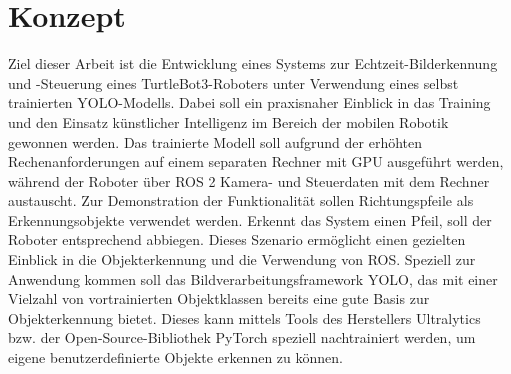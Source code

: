 \section{Konzept}\label{sec:konzept}
Ziel dieser Arbeit ist die Entwicklung eines Systems zur Echtzeit-Bilderkennung und -Steuerung eines TurtleBot3-Roboters unter Verwendung eines selbst trainierten YOLO-Modells. 
Dabei soll ein praxisnaher Einblick in das Training und den Einsatz künstlicher Intelligenz im Bereich der mobilen Robotik gewonnen werden. 
Das trainierte Modell soll aufgrund der erhöhten Rechenanforderungen auf einem separaten Rechner mit GPU ausgeführt werden, während der Roboter über ROS 2 Kamera- und Steuerdaten mit dem Rechner austauscht. 
Zur Demonstration der Funktionalität sollen Richtungspfeile als Erkennungsobjekte verwendet werden. 
Erkennt das System einen Pfeil, soll der Roboter entsprechend abbiegen.
Dieses Szenario ermöglicht einen gezielten Einblick in die Objekterkennung und die Verwendung von ROS.
\newPar
Speziell zur Anwendung kommen soll das Bildverarbeitungsframework YOLO, das mit einer Vielzahl von vortrainierten Objektklassen bereits eine gute Basis zur Objekterkennung bietet.
Dieses kann mittels Tools des Herstellers Ultralytics bzw. der Open\hyp{}Source\hyp{}Bibliothek PyTorch speziell nachtrainiert werden, um eigene benutzerdefinierte Objekte erkennen zu können.